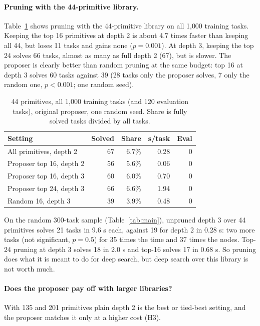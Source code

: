 \documentclass[sigconf,nonacm]{acmart}
\begin{document}
\paragraph{Pruning with the 44-primitive library.}

Table~\ref{tab:small} shows pruning with the 44-primitive library on all 1{,}000 training tasks. Keeping the top 16 primitives at depth 2 is about 4.7 times faster than keeping all 44, but loses 11 tasks and gains none ($p=0.001$). At depth 3, keeping the top 24 solves 66 tasks, almost as many as full depth 2 (67), but is slower. The proposer is clearly better than random pruning at the same budget: top 16 at depth 3 solves 60 tasks against 39 (28 tasks only the proposer solves, 7 only the random one, $p<0.001$; one random seed).

\begin{table}[t]
\caption{44 primitives, all 1{,}000 training tasks (and 120 evaluation tasks), original proposer, one random seed. Share is fully solved tasks divided by all tasks.}
\label{tab:small}
\small
\begin{tabular}{@{}lrrrr@{}}
\toprule
Setting & Solved & Share & s/task & Eval \\
\midrule
All primitives, depth 2 & 67 & 6.7\% & 0.28 & 0 \\
Proposer top 16, depth 2 & 56 & 5.6\% & 0.06 & 0 \\
Proposer top 16, depth 3 & 60 & 6.0\% & 0.70 & 0 \\
Proposer top 24, depth 3 & 66 & 6.6\% & 1.94 & 0 \\
Random 16, depth 3 & 39 & 3.9\% & 0.48 & 0 \\
\bottomrule
\end{tabular}
\end{table}

On the random 300-task sample (Table~\ref{tab:main}), unpruned depth 3 over 44 primitives solves 21 tasks in 9.6 s each, against 19 for depth 2 in 0.28 s: two more tasks (not significant, $p=0.5$) for 35 times the time and 37 times the nodes. Top-24 pruning at depth 3 solves 18 in 2.0 s and top-16 solves 17 in 0.68 s. So pruning does what it is meant to do for deep search, but deep search over this library is not worth much.

\paragraph{Does the proposer pay off with larger libraries?}

With 135 and 201 primitives plain depth 2 is the best or tied-best setting, and the proposer matches it only at a higher cost (H3).
\end{document}
